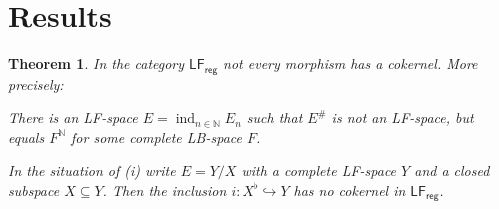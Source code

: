 \documentclass[11pt, a4paper, reqno]{amsart}
\newtheorem{thm}{Theorem}
\theoremstyle{definition}
\newcommand{\ind}{\operatorname{ind}\nolimits}
\newcommand{\NN}{\mathbb{N}}
\newcommand{\LFr}{\mathsf{LF}_{\mathsf{reg}}}
\renewcommand{\sharp}{\texttt{\#}}
\begin{document}
\section{Results}


\begin{thm}\label{THM1} In the category $\LFr$ not every morphism has a cokernel. More precisely:\vspace{3pt}
\begin{compactitem}

\item[(i)] There is an LF-space $E=\ind_{n\in\NN}E_n$ such that $E^{\sharp}$ is not an LF-space, but equals $F^{\NN}$ for some complete LB-space $F$.\vspace{3pt}

\item[(ii)] In the situation of (i) write $E=Y/X$ with a complete LF-space $Y$ and a closed subspace $X\subseteq Y$. Then the inclusion $i\colon X^{\flat}\hookrightarrow Y$ has no cokernel in $\LFr$.
\end{compactitem}
\end{thm}
\end{document}
